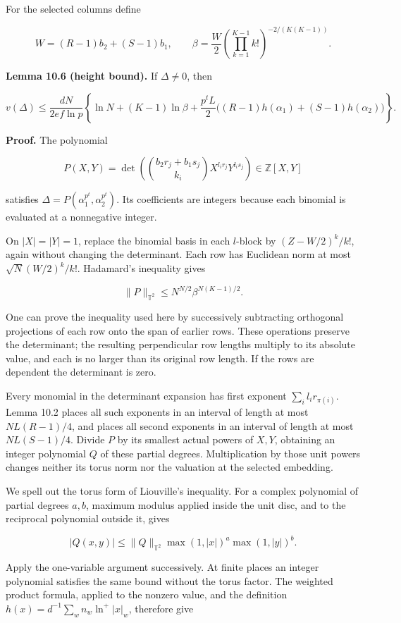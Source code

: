 \documentclass[
  11pt,
  a4paper,
]{article}
\begin{document}
For the selected columns define

\[
W=(R-1)b_2+(S-1)b_1,
\qquad
\beta=\frac W2
\left(\prod_{k=1}^{K-1}k!\right)^{-2/(K(K-1))}.
\tag{10.15}
\]

\textbf{Lemma 10.6 (height bound).} If \(\Delta\ne0\), then

\[
v(\Delta)\le\frac{dN}{2ef\ln p}
\left\{\ln N+(K-1)\ln\beta
+\frac{p^tL}{2}\bigl((R-1)h(\alpha_1)+(S-1)h(\alpha_2)\bigr)\right\}.
\tag{10.16}
\]

\textbf{Proof.} The polynomial

\[
P(X,Y)=\det\!\left(\binom{b_2r_j+b_1s_j}{k_i}X^{l_ir_j}Y^{l_is_j}\right)
\in\mathbb Z[X,Y]
\]

satisfies \(\Delta=P(\alpha_1^{p^t},\alpha_2^{p^t})\). Its coefficients
are integers because each binomial is evaluated at a nonnegative
integer.

On \(|X|=|Y|=1\), replace the binomial basis in each \(l\)-block by
\((Z-W/2)^k/k!\), again without changing the determinant. Each row has
Euclidean norm at most \(\sqrt N(W/2)^k/k!\). Hadamard's inequality
gives

\[
\|P\|_{\mathbb T^2}\le N^{N/2}\beta^{N(K-1)/2}.
\tag{10.17}
\]

One can prove the inequality used here by successively subtracting
orthogonal projections of each row onto the span of earlier rows. These
operations preserve the determinant; the resulting perpendicular row
lengths multiply to its absolute value, and each is no larger than its
original row length. If the rows are dependent the determinant is zero.

Every monomial in the determinant expansion has first exponent
\(\sum_i l_ir_{\pi(i)}\). Lemma 10.2 places all such exponents in an
interval of length at most \(NL(R-1)/4\), and places all second
exponents in an interval of length at most \(NL(S-1)/4\). Divide \(P\)
by its smallest actual powers of \(X,Y\), obtaining an integer
polynomial \(Q\) of these partial degrees. Multiplication by those unit
powers changes neither its torus norm nor the valuation at the selected
embedding.

We spell out the torus form of Liouville's inequality. For a complex
polynomial of partial degrees \(a,b\), maximum modulus applied inside
the unit disc, and to the reciprocal polynomial outside it, gives

\[
|Q(x,y)|\le\|Q\|_{\mathbb T^2}\max(1,|x|)^a\max(1,|y|)^b.
\]

Apply the one-variable argument successively. At finite places an
integer polynomial satisfies the same bound without the torus factor.
The weighted product formula, applied to the nonzero value, and the
definition \(h(x)=d^{-1}\sum_w n_w\ln^+|x|_w\), therefore give
\end{document}
